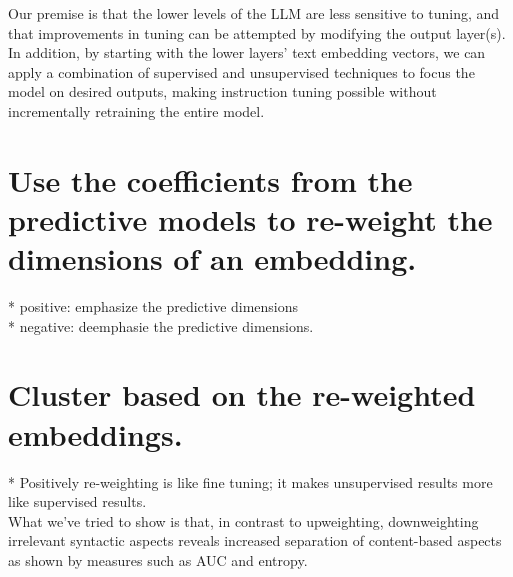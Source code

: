 

Our premise is that the lower levels of the LLM are less sensitive to tuning, and that improvements in tuning can be attempted by modifying the output layer(s). In addition, by starting with the lower layers' text embedding vectors, we can apply a combination of supervised and unsupervised techniques to focus the model on desired outputs, making instruction tuning possible without incrementally retraining the entire model. 


\section{Use the coefficients from the predictive models to re-weight the dimensions of an embedding.}
* positive: emphasize the predictive dimensions\\
* negative: deemphasie the predictive dimensions.\\

\section{Cluster based on the re-weighted embeddings.}

* Positively re-weighting is like fine tuning; it makes unsupervised results more like supervised results.\\

What we've tried to show is that, in contrast to upweighting, downweighting irrelevant syntactic aspects reveals increased separation of content-based aspects as shown by measures such as AUC and entropy.  

